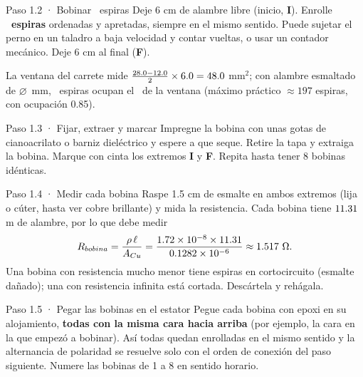 \documentclass[11pt]{article}
\begin{document}
\begin{paso}{Paso 1.2 · Bobinar \ValEspiras\ espiras}
Deje 6 cm de alambre libre (inicio, \textbf{I}). Enrolle \textbf{\ValEspiras\ espiras} ordenadas y apretadas,
siempre en el mismo sentido. Puede sujetar el perno en un taladro a baja velocidad y contar vueltas, o usar
un contador mecánico. Deje 6 cm al final (\textbf{F}).

La ventana del carrete mide $\frac{28.0-12.0}{2}\times6.0
=48.0$ mm$^2$; con alambre esmaltado de $\varnothing$\ValDiametroEsmaltado\ mm, \ValEspiras\
espiras ocupan el \ValOcupacion\ de la ventana (máximo práctico $\approx 197$ espiras, con ocupación 0.85).
\end{paso}

\begin{paso}{Paso 1.3 · Fijar, extraer y marcar}
Impregne la bobina con unas gotas de cianoacrilato o barniz dieléctrico y espere a que seque. Retire la tapa y
extraiga la bobina. Marque con cinta los extremos \textbf{I} y \textbf{F}. Repita hasta tener 8 bobinas
idénticas.
\end{paso}

\begin{paso}{Paso 1.4 · Medir cada bobina}
Raspe 1.5 cm de esmalte en ambos extremos (lija o cúter, hasta ver cobre brillante) y mida la resistencia. Cada
bobina tiene $11.31$ m de alambre, por lo que debe medir
\[
R_{bobina}=\frac{\rho\,\ell}{A_{Cu}}=\frac{1.72\times10^{-8}\times11.31}{0.1282\times10^{-6}}
\approx 1.517\ \Omega .
\]
Una bobina con resistencia mucho menor tiene espiras en cortocircuito (esmalte dañado); una con resistencia
infinita está cortada. Descártela y rehágala.
\end{paso}

\begin{paso}{Paso 1.5 · Pegar las bobinas en el estator}
Pegue cada bobina con epoxi en su alojamiento, \textbf{todas con la misma cara hacia arriba} (por ejemplo, la
cara en la que empezó a bobinar). Así todas quedan enrolladas en el mismo sentido y la alternancia de polaridad
se resuelve solo con el orden de conexión del paso siguiente. Numere las bobinas de 1 a 8 en sentido horario.
\end{paso}
\end{document}
